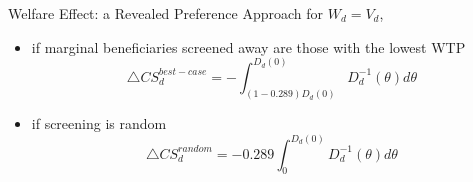 \begin{frame}{Welfare Effect: a Revealed Preference Approach}
    for $W_d=V_d$, 
    \begin{itemize}
        \item if marginal beneficiaries screened away are those with the lowest WTP
        $$\triangle CS_d^{best-case} = -\int_{(1-0.289)D_d(0)}^{D_d(0)} D_d^{-1}(\theta) d\theta $$

        \item if screening is random
        $$\triangle CS_d^{random} = -0.289\int_0^{D_d(0)} D_d^{-1}(\theta) d\theta $$
        
    \end{itemize}
    
\end{frame}


